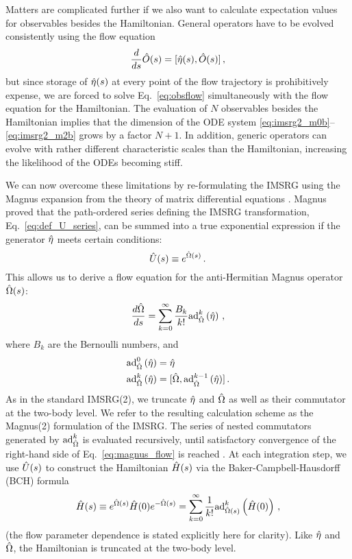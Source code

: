 Matters are complicated further if we also want to calculate expectation
values for observables besides the Hamiltonian. General operators have
to be evolved consistently using the flow equation 
\begin{equation} \label{eq:obsflow}
  \totd{}{s} \OO(s) = \comm{\etaO(s)}{\OO(s)}\,,
\end{equation}
but since storage of $\hat{\eta}(s)$ at every point of the flow trajectory
is prohibitively expense, we are forced to solve Eq.~\eqref{eq:obsflow} 
simultaneously with the flow equation for the Hamiltonian. The evaluation
of $N$ observables besides the Hamiltonian implies that the dimension of
the ODE system \eqref{eq:imsrg2_m0b}--\eqref{eq:imsrg2_m2b} grows by a
factor $N+1$. In addition, generic operators can evolve with rather different 
characteristic scales than the Hamiltonian, increasing the likelihood of 
the ODEs becoming stiff.

We can now overcome these limitations by re-formulating the IMSRG using
the Magnus expansion from the theory of matrix differential equations
\cite{Magnus:1954xy,Blanes:2009fk}. Magnus proved that the path-ordered 
series defining the IMSRG transformation, Eq.~\eqref{eq:def_U_series},
can be summed into a true exponential expression if the generator $\hat{\eta}$
meets certain conditions:
\begin{equation} \label{eq:def_U_magnus}
  \UO(s) \equiv e^{\OmegaO(s)}\,.
\end{equation}
This allows us to derive a flow equation for the anti-Hermitian Magnus
operator $\hat{\Omega}(s)$:
\begin{equation}\label{eq:magnus_flow}
  \frac{d\OmegaO}{ds}= \sum_{k=0}^\infty \frac{B_k}{k!} \mathrm{ad}_{\OmegaO}^k\left(\etaO\right)\,,
\end{equation}
where $B_k$ are the Bernoulli numbers, and 
\begin{align}
  \mathrm{ad}_{\hat{\Omega}}^0\left(\hat{\eta}\right)&=\hat{\eta}\\
  \mathrm{ad}_{\hat{\Omega}}^k\left(\hat{\eta}\right) &= [{\hat{\Omega}},{\mathrm{ad}_{\hat{\Omega}}^{k-1}\left(\hat{\eta}\right)}]\,.
\end{align}
As in the standard IMSRG(2), we truncate $\hat{\eta}$ and $\hat{\Omega}$ as well
as their commutator at the two-body level. We refer to the resulting calculation 
scheme as the Magnus(2) formulation of the IMSRG. 
The series of nested commutators generated by $\mathrm{ad}^k_{\hat{\Omega}}$ 
is evaluated recursively, until satisfactory convergence of the right-hand 
side of Eq.~\eqref{eq:magnus_flow} is reached \cite{Morris:2015ve}. At each 
integration step, we use $\hat{U}(s)$ to construct the
Hamiltonian $\hat{H}(s)$ via the Baker-Campbell-Hausdorff (BCH) formula
\begin{equation}
  \hat{H}(s)\equiv e^{\hat{\Omega}(s)}\hat{H}(0) e^{-\hat{\Omega}(s)} = \sum_{k=0}^\infty\frac{1}{k!}\mathrm{ad}^k_{\hat{\Omega}(s)}\left(\hat{H}(0)\right)\,,
\end{equation}
(the flow parameter dependence is stated explicitly here for clarity).
Like $\hat{\eta}$ and $\hat{\Omega}$, the Hamiltonian is truncated at the two-body
level.

